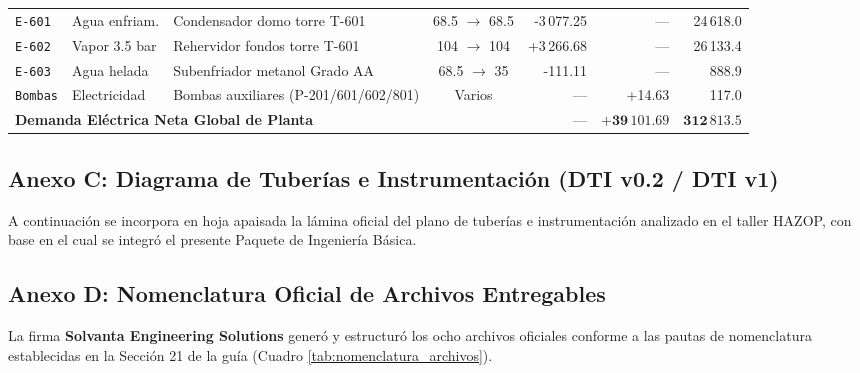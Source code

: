 \documentclass[10pt,letterpaper]{article}
\begin{document}
\begin{table}[H]
\begin{tabularx}{\textwidth}{l p{2.8cm} p{4.0cm} c r r r}
\texttt{E-601} & Agua enfriam. & Condensador domo torre T-601 & 68.5 $\to$ 68.5 & -3\,077.25 & --- & 24\,618.0 \\
\texttt{E-602} & Vapor 3.5 bar & Rehervidor fondos torre T-601 & 104 $\to$ 104 & +3\,266.68 & --- & 26\,133.4 \\
\texttt{E-603} & Agua helada & Subenfriador metanol Grado AA & 68.5 $\to$ 35 & -111.11 & --- & 888.9 \\
\texttt{Bombas} & Electricidad & Bombas auxiliares (P-201/601/602/801) & Varios & --- & +14.63 & 117.0 \\
\midrule
\multicolumn{4}{l}{\textbf{Demanda Eléctrica Neta Global de Planta}} & --- & $\mathbf{+39\,101.69}$ & $\mathbf{312\,813.5}$ \\
\bottomrule
\end{tabularx}
\end{table}

\subsection{Anexo C: Diagrama de Tuberías e Instrumentación (DTI v0.2 / DTI v1)}
A continuación se incorpora en hoja apaisada la lámina oficial del plano de tuberías e instrumentación analizado en el taller HAZOP, con base en el cual se integró el presente Paquete de Ingeniería Básica.



\newpage
\subsection{Anexo D: Nomenclatura Oficial de Archivos Entregables}
La firma \textbf{Solvanta Engineering Solutions} generó y estructuró los ocho archivos oficiales conforme a las pautas de nomenclatura establecidas en la Sección 21 de la guía (Cuadro \ref{tab:nomenclatura_archivos}).
\end{document}
